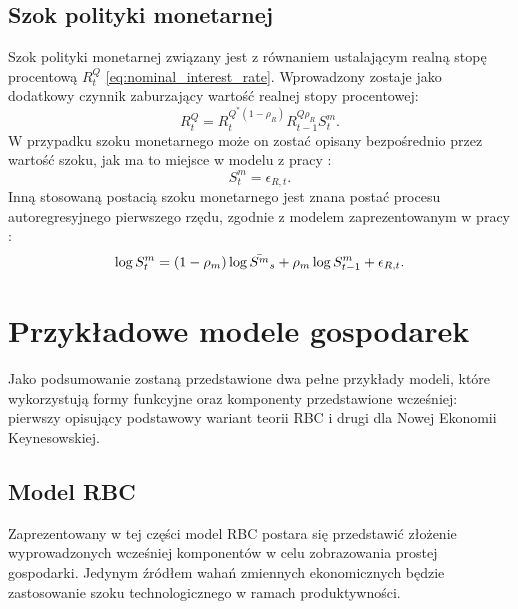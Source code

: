 \subsection{Szok polityki monetarnej}

Szok polityki monetarnej związany jest z równaniem ustalającym realną stopę procentową $R^Q_t$ \eqref{eq:nominal_interest_rate}. Wprowadzony zostaje jako dodatkowy czynnik zaburzający wartość realnej stopy procentowej:
\begin{equation}
    R^Q_t = R_t^{Q^*(1-\rho_R)}R_{t-1}^{Q\rho_R} S^m_{t}.
\end{equation}
W przypadku szoku monetarnego może on zostać opisany bezpośrednio przez wartość szoku, jak ma to miejsce w modelu z pracy \cite{herbst}:
\begin{equation}
    S^m_{t} = \epsilon_{R,t}.
\end{equation}
Inną stosowaną postacią szoku monetarnego jest znana postać procesu autoregresyjnego pierwszego rzędu, zgodnie z modelem zaprezentowanym w pracy \cite{costaBook}:
\begin{equation}
    \log{S^m_t} = (1-\rho_m)\log {\bar{S^m}_s} + \rho_m \log {S^m_{t-1}} + \epsilon_{R,t}.
\end{equation}

\section{Przykładowe modele gospodarek}
\label{sec:sample_models}

Jako podsumowanie zostaną przedstawione dwa pełne przykłady modeli, które wykorzystują formy funkcyjne oraz komponenty przedstawione wcześniej: pierwszy opisujący podstawowy wariant teorii RBC i drugi dla Nowej Ekonomii Keynesowskiej.

\subsection{Model RBC}
\label{sec:rbc_model_sample}

Zaprezentowany w tej części model RBC postara się przedstawić złożenie wyprowadzonych wcześniej komponentów w celu zobrazowania prostej gospodarki. Jedynym źródłem wahań zmiennych ekonomicznych będzie zastosowanie szoku technologicznego w ramach produktywności.

